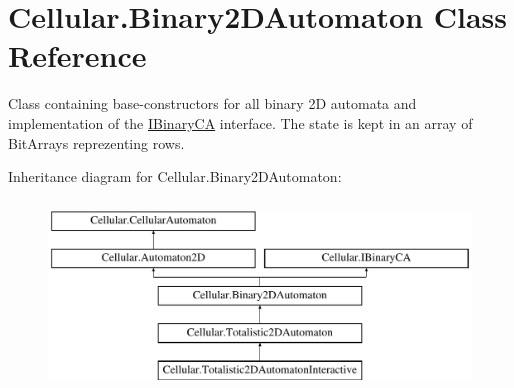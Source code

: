 \hypertarget{class_cellular_1_1_binary2_d_automaton}{}\section{Cellular.\+Binary2\+D\+Automaton Class Reference}
\label{class_cellular_1_1_binary2_d_automaton}


Class containing base-\/constructors for all binary 2\+D automata and implementation of the {\ttfamily \hyperlink{interface_cellular_1_1_i_binary_c_a}{I\+Binary\+C\+A}} interface. The state is kept in an array of {\ttfamily Bit\+Array}s reprezenting rows.  


Inheritance diagram for Cellular.\+Binary2\+D\+Automaton\+:\begin{figure}[H]
\begin{center}
\leavevmode
\includegraphics[height=5.000000cm]{class_cellular_1_1_binary2_d_automaton}
\end{center}
\end{figure}
